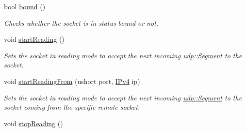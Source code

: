 \begin{DoxyCompactItemize}
bool \hyperlink{structudp_1_1Socket_a0374f88bf7dfc202518c06e9056ccb3c}{bound} ()
\begin{DoxyCompactList}\small\item\em Checks whether the socket is in status bound or not. \end{DoxyCompactList}\item 
void \hyperlink{structudp_1_1Socket_a375f5ff098b53082a034563b18cebf08}{start\+Reading} ()
\begin{DoxyCompactList}\small\item\em Sets the socket in reading mode to accept the next incoming \hyperlink{structudp_1_1Segment}{udp\+::\+Segment} to the socket. \end{DoxyCompactList}\item 
void \hyperlink{structudp_1_1Socket_a56dffa316e5cb39326e418ff1bb92cf0}{start\+Reading\+From} (ushort port, \hyperlink{structIPv4}{I\+Pv4} ip)
\begin{DoxyCompactList}\small\item\em Sets the socket in reading mode to accept the next incoming \hyperlink{structudp_1_1Segment}{udp\+::\+Segment} to the socket coming from the specific remote socket. \end{DoxyCompactList}\item 
void \hyperlink{structudp_1_1Socket_ac2660137ceca93fe8e49037cf2627195}{stop\+Reading} ()\hypertarget{structudp_1_1Socket_ac2660137ceca93fe8e49037cf2627195}{}\label{structudp_1_1Socket_ac2660137ceca93fe8e49037cf2627195}


\end{DoxyCompactItemize}
